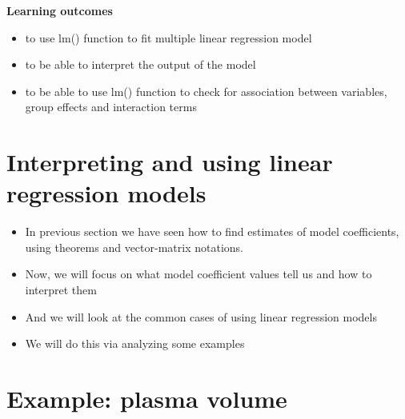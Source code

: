 \documentclass[
]{book}
\providecommand{\tightlist}{%
  \setlength{\itemsep}{0pt}\setlength{\parskip}{0pt}}
\theoremstyle{definition}
\theoremstyle{definition}
\theoremstyle{definition}
\theoremstyle{remark}
\begin{document}
\textbf{Learning outcomes}

\begin{itemize}
\tightlist
\item
  to use lm() function to fit multiple linear regression model
\item
  to be able to interpret the output of the model
\item
  to be able to use lm() function to check for association between variables, group effects and interaction terms
\end{itemize}

\hypertarget{interpreting-and-using-linear-regression-models}{%
\section{Interpreting and using linear regression models}\label{interpreting-and-using-linear-regression-models}}

\begin{itemize}
\tightlist
\item
  In previous section we have seen how to find estimates of model coefficients, using theorems and vector-matrix notations.
\item
  Now, we will focus on what model coefficient values tell us and how to interpret them
\item
  And we will look at the common cases of using linear regression models
\item
  We will do this via analyzing some examples
\end{itemize}

\hypertarget{example-plasma-volume}{%
\section{Example: plasma volume}\label{example-plasma-volume}}
\end{document}
